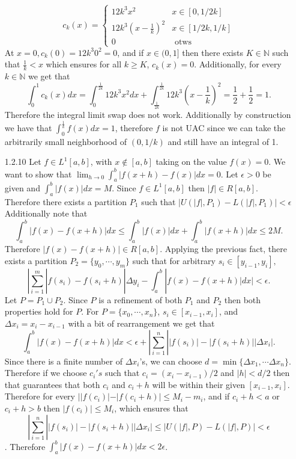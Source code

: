 \documentclass[12pt, letterpaper]{article}
\newcommand{\N}{\mathbb{N}}
\begin{document}
\begin{enumerate}
	$$
	c_k(x) = 
		\begin{cases} 
			12k^3x^2 & x \in [0,1/2k]\\
			12k^3(x-\frac{1}{k})^2 & x \in [1/2k,1/k]\\
			0 &\text{ otws}		
		\end{cases} 
	$$
	At $x=0, c_k(0) = 12k^3 0^2 = 0$, and if $x \in (0,1]$ then there exists 
	$K \in \N$ such that $\frac{1}{k} < x$ which ensures for all $k \geq K$, 
	$c_k(x) = 0$.  Additionally, for every $k \in \N$ we get that
	$$\int_0^1 c_k(x)dx = \int_0^\frac{1}{2k} 12k^3 x^2 dx + 
	\int_\frac{1}{2k}^\frac{1}{2k} 12k^3 (x-\frac{1}{k})^2 = 
	\frac{1}{2} + \frac{1}{2} = 1.$$
	Therefore the integral limit swap does not work.  Additionally by construction
	we have that $\int_0^\frac{1}{k}f(x)dx = 1$, therefore $f$ is not UAC since
	we can take the arbitrarily small neighborhood of $(0,1/k)$ and still have 
	an integral of 1.   
	\item[1.2.10]  Let $f \in L^1 [a,b]$, with $x \not \in [a,b]$ taking on the 
	value $f(x) = 0$.  We want to show that 
	$\lim_{h \to 0} \int_a^b |f(x+h) - f(x)| dx = 0$.  Let $\epsilon > 0$ be given
	and $\int_a^b |f(x)|dx = M$.
	Since $f \in L^1 [a,b]$ then $|f| \in R[a,b]$.  Therefore there exists a 
	partition $P_1$ such that $|U(|f|,P_1) - L(|f|,P_1)| < \epsilon$
	Additionally note that 
	$$\int_a^b |f(x) - f(x+h)| dx \leq \int_a^b |f(x)| dx + \int_a^b |f(x+h)|dx \leq 2M.$$
	Therefore $|f(x) - f(x+h)| \in R[a,b]$.  Applying the previous fact, there 
	exists a partition $P_2 = \{y_0,\cdots,y_m\}$ such that for 
	arbitrary $s_i \in [y_{i-1},y_{i}],$
	$$ |\sum_{i=1}^m |f(s_i) - f(s_i+h)| \Delta y_i - \int_a^b |f(x) - f(x+h)|dx| < \epsilon.$$
	Let $P = P_1 \cup P_2$.  Since $P$ is a refinement of both $P_1$ and $P_2$
	then both properties hold for $P$.  
	For $P = \{x_0,\cdots,x_n\}$, $s_i \in [x_{i-1},x_i]$, and $\Delta x_i = x_i - x_{i-1}$ with a bit of rearrangement we get that 
	$$
	\int_a^b |f(x) - f(x+h)|dx < \epsilon + |\sum_{i=1}^n ||f(s_i)| - |f(s_i+h)|| \Delta x_i|.
	$$
	Since there is a finite number of $\Delta x_i$'s, we can choose 
	$d = \min\{\Delta x_1,\cdots \Delta x_n\}$.  Therefore if we choose $c_i's$
	such that $c_i = (x_{i} - x_{i-1})/2$ and $|h| < d/2$ then that guarantees that
	both $c_i$ and $c_i + h$ will be within their given $[x_{i-1},x_{i}]$.  
	Therefore for every $||f(c_i)| - |f(c_i+h)| \leq M_i - m_i$, and if $c_i + h < a$ 
	or $c_i + h  > b$ then $|f(c_i)| \leq M_i$, which ensures that 
	$$|\sum_{i=1}^n ||f(s_i)| - |f(s_i+h)|| \Delta x_i| \leq |U(|f|,P) - L(|f|,P)| < \epsilon$$.  Therefore $\int_a^b |f(x) - f(x+h)|dx  < 2 \epsilon$.  

\end{enumerate}
\end{document}
